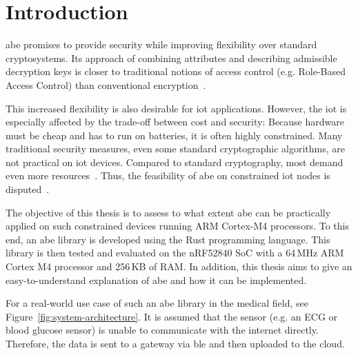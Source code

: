 
\chapter{Introduction}\label{chapter:introduction}

\acrfull{abe} promises to provide security while improving flexibility over standard cryptosystems.
Its approach of combining \glspl{attribute} and  describing admissible decryption keys is closer to traditional notions of access control (e.g. Role-Based Access Control) than conventional encryption~\cite{bethencourt_ciphertext-policy_2007}.

This increased flexibility is also desirable for \acrfull{iot} applications.
However, the \acrshort{iot} is especially affected by the trade-off between cost and security:
Because hardware must be cheap and has to run on batteries, it is often highly constrained.
Many traditional security measures, even some standard cryptographic algorithms, are not practical on \acrshort{iot} devices.
Compared to standard cryptography, most  demand even more resources~\cite{wang_performance_2014}.
Thus, the feasibility of \acrshort{abe} on constrained \acrshort{iot} nodes is disputed~\cite{ambrosin_feasibility_2016,ambrosin_feasibility_2015,borgh_attribute-based_2016,girgenti_feasibility_2019,wang_performance_2014}.

The objective of this thesis is to assess to what extent \acrshort{abe} can be practically applied on such constrained devices running ARM Cortex-M4 processors.
To this end, an \acrshort{abe} library is developed using the Rust programming language.
This library is then tested and evaluated on the nRF52840 SoC with a 64\,MHz ARM Cortex M4 processor and 256\,KB of RAM.
In addition, this thesis aims to give an easy-to-understand explanation of \acrshort{abe} and how it can be implemented.



For a real-world use case of such an \acrshort{abe} library in the medical field, see Figure~\ref{fig:system-architecture}. %
It is assumed that the sensor (e.g. an ECG or blood glucose sensor) is unable to communicate with the internet directly.
Therefore, the data is sent to a gateway via \acrfull{ble} and then uploaded to the cloud.

